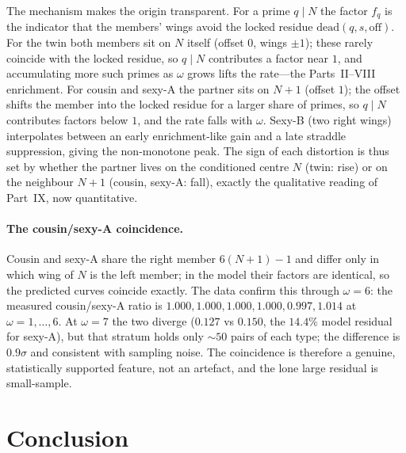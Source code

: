 \documentclass[11pt]{article}
\begin{document}
The mechanism makes the origin transparent. For a prime $q\mid N$ the factor
$f_q$ is the indicator that the members' wings avoid the locked residue
$\mathrm{dead}(q,s,\mathrm{off})$. For the twin both members sit on $N$ itself
(offset $0$, wings $\pm1$); these rarely coincide with the locked residue, so
$q\mid N$ contributes a factor near $1$, and accumulating more such primes as
$\omega$ grows lifts the rate---the Parts~II--VIII enrichment. For cousin and
sexy-A the partner sits on $N{+}1$ (offset $1$); the offset shifts the member into
the locked residue for a larger share of primes, so $q\mid N$ contributes factors
below $1$, and the rate falls with $\omega$. Sexy-B (two right wings) interpolates
between an early enrichment-like gain and a late straddle suppression, giving the
non-monotone peak. The sign of each distortion is thus set by whether the
partner lives on the conditioned centre $N$ (twin: rise) or on the neighbour
$N{+}1$ (cousin, sexy-A: fall), exactly the qualitative reading of Part~IX, now
quantitative.

\paragraph{The cousin/sexy-A coincidence.}
Cousin and sexy-A share the right member $6(N{+}1){-}1$ and differ only in which
wing of $N$ is the left member; in the model their factors are identical, so the
predicted curves coincide exactly. The data confirm this through $\omega=6$: the
measured cousin/sexy-A ratio is $1.000,1.000,1.000,1.000,0.997,1.014$ at
$\omega=1,\dots,6$. At $\omega=7$ the two diverge ($0.127$ vs $0.150$, the
$14.4\%$ model residual for sexy-A), but that stratum holds only $\sim50$ pairs of
each type; the difference is $0.9\sigma$ and consistent with sampling noise. The
coincidence is therefore a genuine, statistically supported feature, not an
artefact, and the lone large residual is small-sample.

\section{Conclusion}
\end{document}
